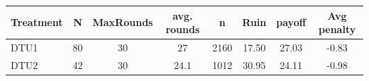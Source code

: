 \begin{tabular}{l|ccccccc}
\hline
\small Treatment   & \small   N &   \small MaxRounds &  \small  avg. rounds &  \small  n &  \small Ruin & \small   payoff & \small   Avg penalty \\
\hline
\small DTU1     &  80 &  30 &    27 & 2160 & 17.50 & 27.03 & -0.83 \\
\small DTU2     &  42 &  30 &  24.1 & 1012 & 30.95 & 24.11 & -0.98 \\
\hline
\end{tabular}

